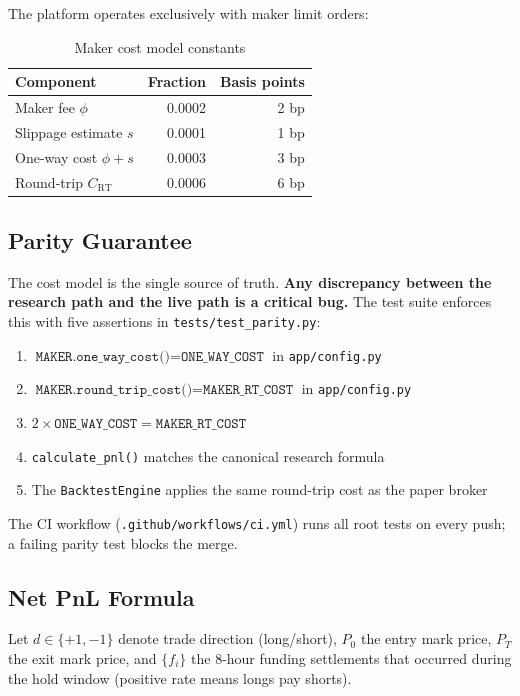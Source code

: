 \documentclass[12pt, a4paper]{article}
\theoremstyle{definition}
\begin{document}
The platform operates exclusively with maker limit orders:

\begin{table}[H]
\centering
\caption{Maker cost model constants}
\begin{tabular}{lrr}
\toprule
\textbf{Component} & \textbf{Fraction} & \textbf{Basis points} \\
\midrule
Maker fee $\phi$       & 0.0002 & 2 bp \\
Slippage estimate $s$  & 0.0001 & 1 bp \\
One-way cost $\phi + s$ & 0.0003 & 3 bp \\
Round-trip $C_{\text{RT}}$ & 0.0006 & 6 bp \\
\bottomrule
\end{tabular}
\end{table}

\subsection{Parity Guarantee}

The cost model is the single source of truth. \textbf{Any discrepancy between
the research path and the live path is a critical bug.} The test suite enforces
this with five assertions in \texttt{tests/test\_parity.py}:

\begin{enumerate}[leftmargin=2em]
    \item $\texttt{MAKER.one\_way\_cost()} = \texttt{ONE\_WAY\_COST}$ in \texttt{app/config.py}
    \item $\texttt{MAKER.round\_trip\_cost()} = \texttt{MAKER\_RT\_COST}$ in \texttt{app/config.py}
    \item $2 \times \texttt{ONE\_WAY\_COST} = \texttt{MAKER\_RT\_COST}$
    \item \texttt{calculate\_pnl()} matches the canonical research formula
    \item The \texttt{BacktestEngine} applies the same round-trip cost as the paper broker
\end{enumerate}

The CI workflow (\texttt{.github/workflows/ci.yml}) runs all root tests on
every push; a failing parity test blocks the merge.

\subsection{Net PnL Formula}

Let $d \in \{+1, -1\}$ denote trade direction (long/short), $P_0$ the
entry mark price, $P_T$ the exit mark price, and $\{f_i\}$ the 8-hour
funding settlements that occurred during the hold window (positive rate
means longs pay shorts).
\end{document}
